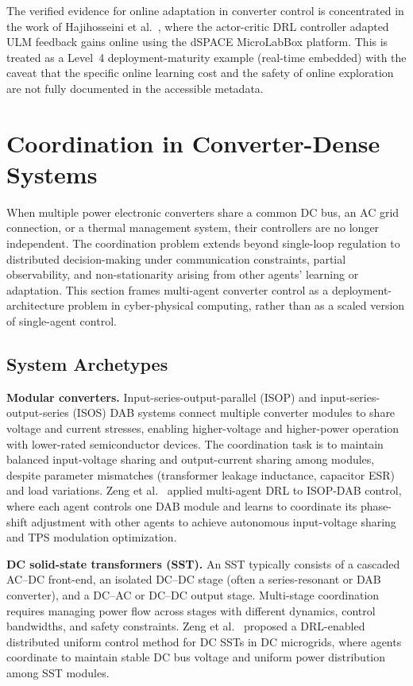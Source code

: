 \documentclass[manuscript,screen,review]{acmart}
\begin{document}
The verified evidence for online adaptation in converter control is concentrated in the work of Hajihosseini et al.~\cite{hajihosseini2020dc}, where the actor-critic DRL controller adapted ULM feedback gains online using the dSPACE MicroLabBox platform.
This is treated as a Level~4 deployment-maturity example (real-time embedded) with the caveat that the specific online learning cost and the safety of online exploration are not fully documented in the accessible metadata.

\section{Coordination in Converter-Dense Systems}
\label{sec:coordination}

When multiple power electronic converters share a common DC bus, an AC grid connection, or a thermal management system, their controllers are no longer independent.
The coordination problem extends beyond single-loop regulation to distributed decision-making under communication constraints, partial observability, and non-stationarity arising from other agents' learning or adaptation.
This section frames multi-agent converter control as a deployment-architecture problem in cyber-physical computing, rather than as a scaled version of single-agent control.

\subsection{System Archetypes}

\textbf{Modular converters.}
Input-series-output-parallel (ISOP) and input-series-output-series (ISOS) DAB systems connect multiple converter modules to share voltage and current stresses, enabling higher-voltage and higher-power operation with lower-rated semiconductor devices.
The coordination task is to maintain balanced input-voltage sharing and output-current sharing among modules, despite parameter mismatches (transformer leakage inductance, capacitor ESR) and load variations.
Zeng et al.~\cite{zeng2022autonomous,zeng2022multiagent} applied multi-agent DRL to ISOP-DAB control, where each agent controls one DAB module and learns to coordinate its phase-shift adjustment with other agents to achieve autonomous input-voltage sharing and TPS modulation optimization.

\textbf{DC solid-state transformers (SST).}
An SST typically consists of a cascaded AC--DC front-end, an isolated DC--DC stage (often a series-resonant or DAB converter), and a DC--AC or DC--DC output stage.
Multi-stage coordination requires managing power flow across stages with different dynamics, control bandwidths, and safety constraints.
Zeng et al.~\cite{zeng2023deep} proposed a DRL-enabled distributed uniform control method for DC SSTs in DC microgrids, where agents coordinate to maintain stable DC bus voltage and uniform power distribution among SST modules.
\end{document}
